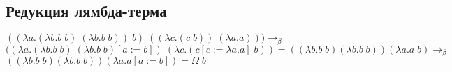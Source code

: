 \documentclass{article}
\begin{document}
\begin{center}
\section*{Редукция лямбда-терма}
$((\lambda a.(\lambda b.b\; b)\; (\lambda b.b\; b))\; b)\; ((\lambda c.(c\; b))\; (\lambda a.a))) \to_\beta$ \\
$((\lambda a.(\lambda b.b\; b)\; (\lambda b.b\; b)[a := b])\; (\lambda c.(c[c := \lambda a.a]\; b)) = ((\lambda b.b\; b)(\lambda b.b\; b))(\lambda a.a\; b) \to_\beta$ \\
$((\lambda b.b\; b)(\lambda b.b\; b))(\lambda a.a [a := b]) = \Omega\; b$
\end{center}
\end{document}
